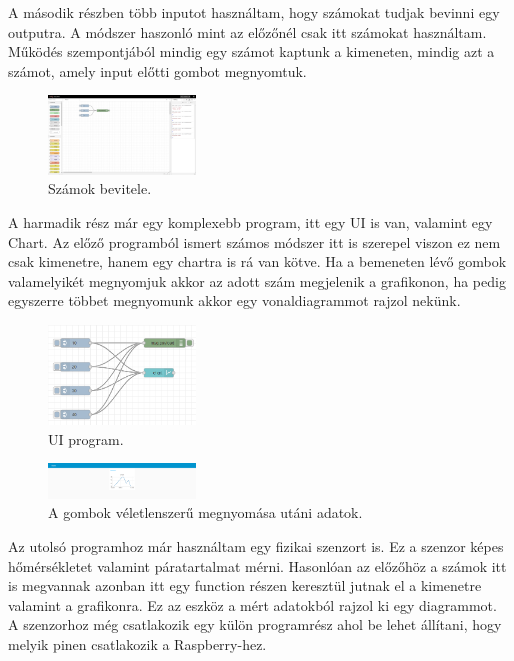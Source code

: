 \documentclass[a4paper,12pt,oneside]{report}
\begin{document}
A második részben több inputot használtam, hogy számokat tudjak bevinni egy outputra. A módszer haszonló mint az előzőnél
csak itt számokat használtam. Működés szempontjából mindig egy számot kaptunk a kimeneten, mindig azt a számot, amely input előtti
gombot megnyomtuk.

\begin{figure}[htbp]
	\centering
	\includegraphics[width=0.35\textwidth]{fig/Numbers.png}
	\caption{Számok bevitele.}
	\label{fig-Numbers}
\end{figure}

A harmadik rész már egy komplexebb program, itt egy UI is van, valamint egy Chart. Az előző programból ismert számos módszer
itt is szerepel viszon ez nem csak kimenetre, hanem egy chartra is rá van kötve. Ha a bemeneten lévő gombok valamelyikét megnyomjuk 
akkor az adott szám megjelenik a grafikonon, ha pedig egyszerre többet megnyomunk akkor egy vonaldiagrammot rajzol nekünk.

\begin{figure}[htbp]
	\centering
	\includegraphics[width=0.35\textwidth]{fig/uichart.png}
	\caption{UI program.}
	\label{fig-uichart}
\end{figure}

\begin{figure}[htbp]
	\centering
	\includegraphics[width=0.35\textwidth]{fig/chart.png}
	\caption{A gombok véletlenszerű megnyomása utáni adatok.}
	\label{fig-chart}
\end{figure}

Az utolsó programhoz már használtam egy fizikai szenzort is. Ez a szenzor képes hőmérsékletet valamint páratartalmat mérni.
Hasonlóan az előzőhöz a számok itt is megvannak azonban itt egy function részen keresztül jutnak el a kimenetre valamint a 
grafikonra. Ez az eszköz a mért adatokból rajzol ki egy diagrammot. A szenzorhoz még csatlakozik egy külön programrész ahol be lehet
állítani, hogy melyik pinen csatlakozik a Raspberry-hez.
\end{document}
